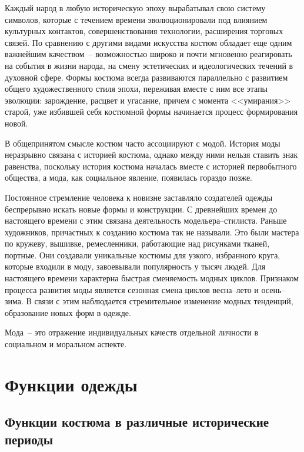   Каждый народ в любую историческую эпоху вырабатывал свою систему символов,
  которые с течением времени эволюционировали под влиянием культурных
  контактов, совершенствования технологии, расширения торговых связей. По
  сравнению с другими видами искусства костюм обладает еще одним важнейшим
  качеством~-- возможностью широко и почти мгновенно реагировать на события в
  жизни народа, на смену эстетических и идеологических течений в духовной
  сфере. Формы костюма всегда развиваются параллельно с развитием общего
  художественного стиля эпохи, переживая вместе с ним все этапы эволюции:
  зарождение, расцвет и угасание, причем с момента <<умирания>> старой, уже
  избившей себя костюмной формы начинается процесс формирования новой.
  
  В общепринятом смысле костюм часто ассоциируют с модой. История моды
  неразрывно связана с историей костюма, однако между ними нельзя ставить знак
  равенства, поскольку история костюма  началась вместе с историей первобытного
  общества, а мода, как социальное явление, появилась гораздо позже.
  
  Постоянное стремление человека к новизне заставляло создателей одежды
  беспрерывно искать новые формы и конструкции. С древнейших времен до
  настоящего времени с этим связана деятельность модельера--стилиста. Раньше
  художников, причастных к созданию костюма так не называли. Это были мастера
  по кружеву, вышивке, ремесленники, работающие над рисунками тканей, портные.
  Они создавали уникальные костюмы для узкого, избранного круга, которые
  входили в моду, завоевывали популярность у тысяч людей. Для настоящего
  времени характерна быстрая сменяемость модных циклов. Признаком процесса
  развития моды является сезонная смена циклов весна--лето и осень--зима. В
  связи с этим наблюдается стремительное изменение модных тенденций,
  образование новых форм в одежде.
  
  Мода~-- это отражение индивидуальных качеств отдельной личности в социальном
  и моральном аспекте.~\cite{bib:0}
  
  \section{Функции одежды}
  
  \subsection{Функции костюма в различные исторические периоды}
  

